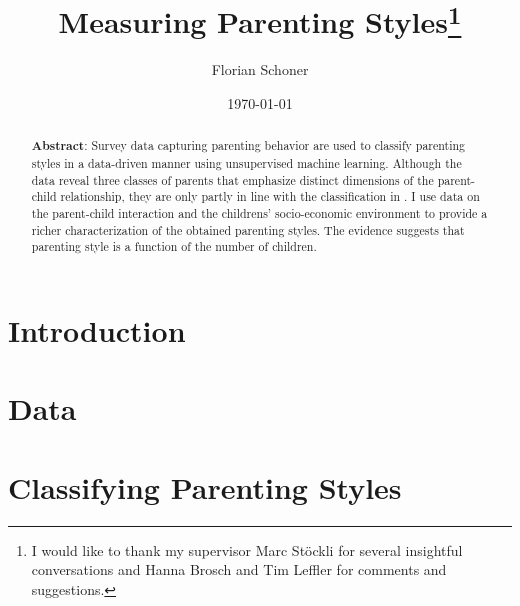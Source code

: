 \documentclass[a4paper,captions=tableheading,12pt]{scrartcl}
\title{Measuring Parenting Styles\thanks{I would like to thank my supervisor Marc Stöckli for several insightful conversations and Hanna Brosch and Tim Leffler for comments and suggestions.}}
\author{
	\large Florian Schoner
}
\date{\large \today}
\begin{document}
	\maketitle
	\thispagestyle{empty}
	\begin{abstract}
		\noindent\textbf{Abstract}: Survey data capturing parenting behavior are used to classify parenting styles in a data-driven manner using unsupervised machine learning. Although the data reveal three classes of parents that emphasize distinct dimensions of the parent-child relationship, they are only partly in line with the classification in \textcite{baumrindChildCarePractices1967}. I use data on the parent-child interaction and the childrens' socio-economic environment to provide a richer characterization of the obtained parenting styles. The evidence suggests that parenting style is a function of the number of children.
		\bigskip
	\end{abstract}
	\pagebreak
	
	\section{Introduction} \label{sec:intro}
	
	
	\section{Data} \label{sec:data}
	
	
	\section{Classifying Parenting Styles} \label{sec:classifying}
	
	
\end{document}
